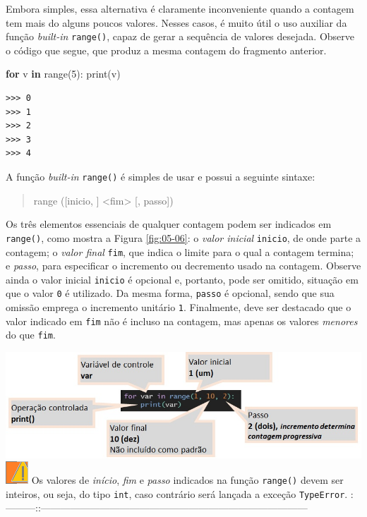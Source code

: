 \documentclass[
]{book}
\newenvironment{Shaded}{\begin{snugshade}}{\end{snugshade}}
\newcommand{\BuiltInTok}[1]{#1}
\newcommand{\ControlFlowTok}[1]{\textcolor[rgb]{0.13,0.29,0.53}{\textbf{#1}}}
\newcommand{\DecValTok}[1]{\textcolor[rgb]{0.00,0.00,0.81}{#1}}
\newcommand{\KeywordTok}[1]{\textcolor[rgb]{0.13,0.29,0.53}{\textbf{#1}}}
\newcommand{\NormalTok}[1]{#1}
\begin{document}
Embora simples, essa alternativa é claramente inconveniente quando a contagem tem mais do alguns poucos valores. Nesses casos, é muito útil o uso auxiliar da função \emph{built-in} \texttt{range()}, capaz de gerar a sequência de valores desejada. Observe o código que segue, que produz a mesma contagem do fragmento anterior.

\begin{Shaded}
\begin{Highlighting}[]
\ControlFlowTok{for}\NormalTok{ v }\KeywordTok{in} \BuiltInTok{range}\NormalTok{(}\DecValTok{5}\NormalTok{):}
    \BuiltInTok{print}\NormalTok{(v)}
\end{Highlighting}
\end{Shaded}

\begin{verbatim}
>>> 0
>>> 1
>>> 2
>>> 3
>>> 4
\end{verbatim}

A função \emph{built-in} \texttt{range()} é simples de usar e possui a seguinte sintaxe:

\begin{quote}
range ({[}inicio, {]} \textless fim\textgreater{} {[}, passo{]})
\end{quote}

Os três elementos essenciais de qualquer contagem podem ser indicados em \texttt{range()}, como mostra a Figura \ref{fig:05-06}: o \emph{valor inicial} \texttt{inicio}, de onde parte a contagem; o \emph{valor final} \texttt{fim}, que indica o limite para o qual a contagem termina; e \emph{passo}, para especificar o incremento ou decremento usado na contagem. Observe ainda o valor inicial \texttt{inicio} é opcional e, portanto, pode ser omitido, situação em que o valor \texttt{0} é utilizado. Da mesma forma, \texttt{passo} é opcional, sendo que sua omissão emprega o incremento unitário \texttt{1}. Finalmente, deve ser destacado que o valor indicado em \texttt{fim} não é incluso na contagem, mas apenas os valores \emph{menores} do que \texttt{fim}.

\includegraphics{images/05-06.jpg}
\textbar{} \includegraphics{images/warn.png} \textbar{} Os valores de \emph{início}, \emph{fim} e \emph{passo} indicados na função \texttt{range()} devem ser inteiros, ou seja, do tipo \texttt{int}, caso contrário será lançada a exceção \texttt{TypeError}. \textbar{}
\textbar:---------:\textbar:---------------------------------------------------------------------------------\textbar{}
\end{document}

